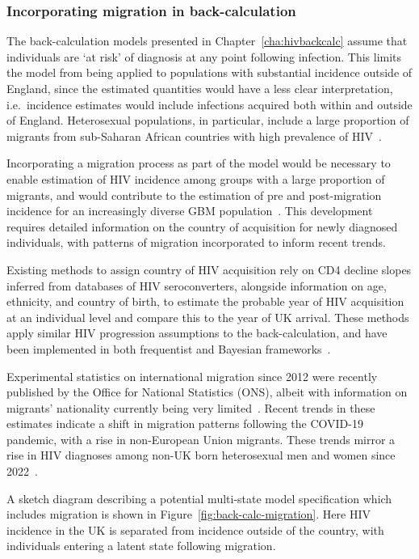 \subsubsection{Incorporating migration in back-calculation}

The back-calculation models presented in Chapter~\ref{cha:hivbackcalc} assume that individuals are `at risk' of diagnosis at any point following infection. This limits the model from being applied to populations with substantial incidence outside of England, since the estimated quantities would have a less clear interpretation, i.e.\ incidence estimates would include infections acquired both within and outside of England. Heterosexual populations, in particular, include a large proportion of migrants from sub-Saharan African countries with high prevalence of HIV~\parencite{Martin2023-um}.

Incorporating a migration process as part of the model would be necessary to enable estimation of HIV incidence among groups with a large proportion of migrants, and would contribute to the estimation of pre and post-migration incidence for an increasingly diverse GBM population~\parencite{Palich2024-hz}. This development requires detailed information on the country of acquisition for newly diagnosed individuals, with patterns of migration incorporated to inform recent trends.

Existing methods to assign country of HIV acquisition rely on CD4 decline slopes inferred from databases of HIV seroconverters, alongside information on age, ethnicity, and country of birth, to estimate the probable year of HIV acquisition at an individual level and compare this to the year of UK arrival. These methods apply similar HIV progression assumptions to the back-calculation, and have been implemented in both frequentist and Bayesian frameworks~\parencite{Pantazis2019-nr, Yin2021-me}.

Experimental statistics on international migration since 2012 were recently published by the Office for National Statistics (ONS), albeit with information on migrants' nationality currently being very limited~\parencite{Cheatham2023-yb}. Recent trends in these estimates indicate a shift in migration patterns following the COVID-19 pandemic, with a rise in non-European Union migrants. These trends mirror a rise in HIV diagnoses among non-UK born heterosexual men and women since 2022~\parencite{Martin2023-um}.

A sketch diagram describing a potential multi-state model specification which includes migration is shown in Figure~\ref{fig:back-calc-migration}. Here HIV incidence in the UK is separated from incidence outside of the country, with individuals entering a latent state following migration.

